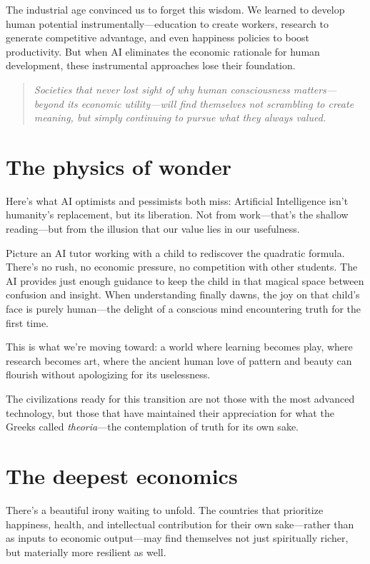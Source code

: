 \documentclass[11pt]{article}
\newenvironment{pullquote}
  {\begin{quote}\itshape\color{blue!40!black}}
  {\end{quote}}
\begin{document}
The industrial age convinced us to forget this wisdom. We learned to develop
human potential instrumentally---education to create workers, research to
generate competitive advantage, and even happiness policies to boost
productivity. But when AI eliminates the economic rationale for human
development, these instrumental approaches lose their foundation.

\begin{pullquote}
Societies that never lost sight of why human consciousness matters---beyond its
economic utility---will find themselves not scrambling to create meaning, but
simply continuing to pursue what they always valued.
\end{pullquote}

\section{The physics of wonder}

Here's what AI optimists and pessimists both miss: Artificial Intelligence
isn't humanity's replacement, but its liberation. Not from work---that's the
shallow reading---but from the illusion that our value lies in our usefulness.

Picture an AI tutor working with a child to rediscover the quadratic formula.
There's no rush, no economic pressure, no competition with other students. The
AI provides just enough guidance to keep the child in that magical space
between confusion and insight. When understanding finally dawns, the joy on
that child's face is purely human---the delight of a conscious mind encountering
truth for the first time.

This is what we're moving toward: a world where learning becomes play, where
research becomes art, where the ancient human love of pattern and beauty can
flourish without apologizing for its uselessness.

The civilizations ready for this transition are not those with the most
advanced technology, but those that have maintained their appreciation for what
the Greeks called \emph{theoria}---the contemplation of truth for its own sake.

\section{The deepest economics}

There's a beautiful irony waiting to unfold. The countries that prioritize
happiness, health, and intellectual contribution for their own sake---rather
than as inputs to economic output---may find themselves not just spiritually
richer, but materially more resilient as well.
\end{document}

